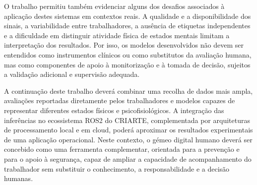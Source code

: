 O trabalho permitiu também evidenciar alguns dos desafios associados à aplicação destes sistemas em contextos reais. A qualidade e a disponibilidade dos sinais, a variabilidade entre trabalhadores, a ausência de etiquetas independentes e a dificuldade em distinguir atividade física de estados mentais limitam a interpretação dos resultados. Por isso, os modelos desenvolvidos não devem ser entendidos como instrumentos clínicos ou como substitutos da avaliação humana, mas como componentes de apoio à monitorização e à tomada de decisão, sujeitos a validação adicional e supervisão adequada.

A continuação deste trabalho deverá combinar uma recolha de dados mais ampla, avaliações reportadas diretamente pelos trabalhadores e modelos capazes de representar diferentes estados físicos e psicofisiológicos. A integração das inferências no ecossistema ROS2 do CRIARTE, complementada por arquiteturas de processamento local e em cloud, poderá aproximar os resultados experimentais de uma aplicação operacional. Neste contexto, o gémeo digital humano deverá ser concebido como uma ferramenta complementar, orientada para a prevenção e para o apoio à segurança, capaz de ampliar a capacidade de acompanhamento do trabalhador sem substituir o conhecimento, a responsabilidade e a decisão humanas.